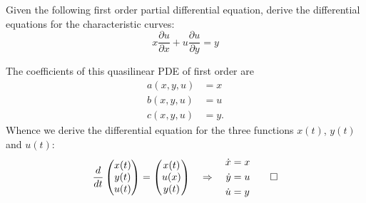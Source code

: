 Given the following first order partial differential equation, derive
the differential equations for the characteristic curves:
\[
x
\frac{\partial u}{\partial x}
+
u
\frac{\partial u}{\partial y}
=
y
\]

\begin{loesung}
The coefficients of this quasilinear PDE of first order are
\begin{align*}
a(x,y,u)&= x \\
b(x,y,u)&= u \\
c(x,y,u)&= y.
\end{align*}
Whence we derive the differential equation for the three functions
$x(t)$, $y(t)$ and $u(t)$:
\[
\frac{d}{dt}
\begin{pmatrix}
x(t)\\y(t)\\u(t)
\end{pmatrix}
=
\begin{pmatrix}
x(t)\\u(x)\\y(t)
\end{pmatrix}
\quad\Rightarrow\quad
\begin{aligned}
\dot{x}&=x\\
\dot{y}&=u\\
\dot{u}&=y
\end{aligned}
\qedhere
\]
\end{loesung}
